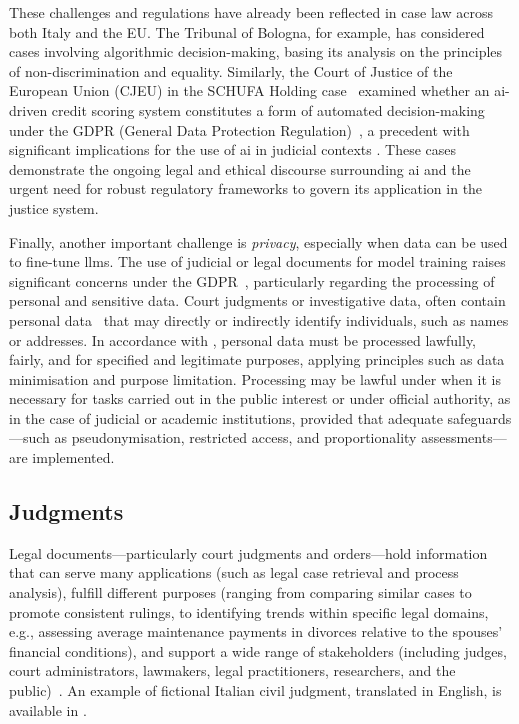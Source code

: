 These challenges and regulations have already been reflected in case law across both Italy and the EU. The Tribunal of Bologna, for example, has considered cases involving algorithmic decision-making, basing its analysis on the principles of non-discrimination and equality. Similarly, the Court of Justice of the European Union (CJEU) in the SCHUFA Holding case~\cite{schufaholding2023} examined whether an \ac{ai}-driven credit scoring system constitutes a form of automated decision-making under the GDPR (General Data Protection Regulation)~\cite{gdpr2016}, a precedent with significant implications for the use of \ac{ai} in judicial contexts \cite{juliahb2024}. These cases demonstrate the ongoing legal and ethical discourse surrounding \ac{ai} and the urgent need for robust regulatory frameworks to govern its application in the justice system.

Finally, another important challenge is \emph{privacy}, especially when data can be used to fine-tune \acp{llm}. The use of judicial or legal documents for model training raises significant concerns under the GDPR~\cite{gdpr2016}, particularly regarding the processing of personal and sensitive data. Court judgments or investigative data, often contain personal data~\cite[Art.~4]{gdpr2016} that may directly or indirectly identify individuals, such as names or addresses. In accordance with \textcite[Art.~5]{gdpr2016}, personal data must be processed lawfully, fairly, and for specified and legitimate purposes, applying principles such as data minimisation and purpose limitation. Processing may be lawful under \textcite[Art.~6(1)(e)]{gdpr2016} when it is necessary for tasks carried out in the public interest or under official authority, as in the case of judicial or academic institutions, provided that adequate safeguards—such as pseudonymisation, restricted access, and proportionality assessments—are implemented.




\subsection{Judgments}
Legal documents---particularly court judgments and orders---hold information that can serve many applications (such as legal case retrieval and process analysis), fulfill different purposes (ranging from comparing similar cases to promote consistent rulings, to identifying trends within specific legal domains, e.g., assessing average maintenance payments in divorces relative to the spouses' financial conditions), and support a wide range of stakeholders (including judges, court administrators, lawmakers, legal practitioners, researchers, and the public)~\cite{BELLANDI2024}.
An example of fictional Italian civil judgment, translated in English, is available in .

